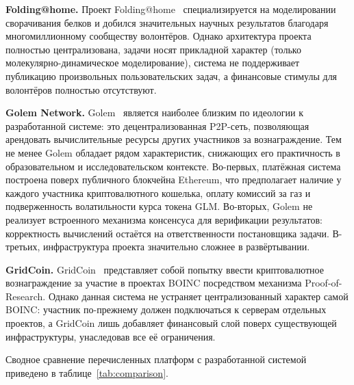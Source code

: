 \documentclass[a4paper,11pt]{extarticle}
\begin{document}
\textbf{Folding@home.} Проект Folding@home~\cite{foldinghome} специализируется
на моделировании сворачивания белков и добился значительных научных результатов
благодаря многомиллионному сообществу волонтёров. Однако архитектура проекта
полностью централизована, задачи носят прикладной характер (только
молекулярно-динамическое моделирование), система не поддерживает публикацию
произвольных пользовательских задач, а финансовые стимулы для волонтёров
полностью отсутствуют.

\textbf{Golem Network.} Golem~\cite{golem_whitepaper} является наиболее
близким по идеологии к разработанной системе: это децентрализованная P2P-сеть,
позволяющая арендовать вычислительные ресурсы других участников за
вознаграждение. Тем не менее Golem обладает рядом характеристик, снижающих его
практичность в образовательном и исследовательском контексте. Во-первых,
платёжная система построена поверх публичного блокчейна Ethereum, что
предполагает наличие у каждого участника криптовалютного кошелька, оплату
комиссий за газ и подверженность волатильности курса токена GLM. Во-вторых,
Golem не реализует встроенного механизма консенсуса для верификации результатов:
корректность вычислений остаётся на ответственности постановщика задачи.
В-третьих, инфраструктура проекта значительно сложнее в развёртывании.

\textbf{GridCoin.} GridCoin~\cite{gridcoin} представляет собой попытку ввести
криптовалютное вознаграждение за участие в проектах BOINC посредством
механизма Proof-of-Research. Однако данная система не устраняет централизованный
характер самой BOINC: участник по-прежнему должен подключаться к серверам
отдельных проектов, а GridCoin лишь добавляет финансовый слой поверх
существующей инфраструктуры, унаследовав все её ограничения.

Сводное сравнение перечисленных платформ с разработанной системой приведено
в таблице~\ref{tab:comparison}.

\begin{table}[h!]
\centering
\caption{Сравнение платформ для организации распределённых вычислений}
\label{tab:comparison}
\end{table}
\end{document}
